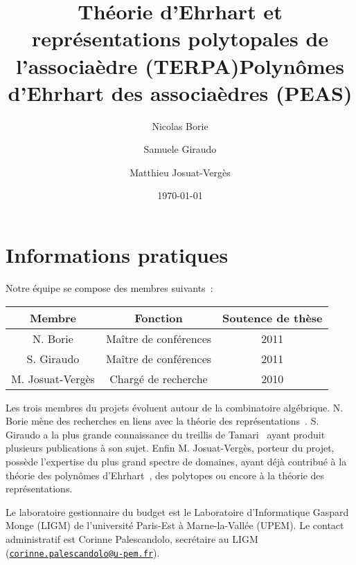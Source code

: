 \documentclass[a4paper, 10pt]{article}
\title{Théorie d'Ehrhart et représentations polytopales de
l'associaèdre (TERPA)} %
\title{{\bf P}olynômes d'{\bf E}hrhart des {\bf a}ssociaèdre{\bf s}
(PEAS)}
\date{\today}
\author{Nicolas Borie \and Samuele Giraudo \and Matthieu Josuat-Verg\`es}
\numberwithin{equation}{subsection}
\begin{document}
\maketitle
\vspace{-1.5cm}

\section*{\center Informations pratiques}
Notre équipe se compose des membres suivants~:
\begin{center} \small
\begin{tabular}{|c|c|c|} \hline
    {\bf Membre} & {\bf Fonction} & {\bf Soutence de thèse}
        \\ \hline \hline
    N. Borie & Maître de conférences & 2011 \\ \hline
    S. Giraudo & Maître de conférences & 2011 \\ \hline
    M. Josuat-Vergès & Chargé de recherche & 2010 \\ \hline
\end{tabular}
\end{center}
\smallbreak

Les trois membres du projets évoluent autour de la combinatoire
algébrique. N. Borie mène des recherches en liens avec la théorie des
représentations~\cite{Bor15}. S. Giraudo a la plus grande connaissance
du treillis de Tamari~\cite{Gir12} ayant produit plusieurs publications
à son sujet. Enfin M. Josuat-Vergès, porteur du projet, possède
l'expertise du plus grand spectre de domaines, ayant déjà contribué à la
théorie des polynômes d'Ehrhart~\cite{HJV16}, des polytopes ou encore à
la théorie des représentations.
\smallbreak

Le laboratoire gestionnaire du budget est le Laboratoire d'Informatique
Gaspard Monge (LIGM) de l'université Paris-Est à Marne-la-Vallée (UPEM).
Le contact administratif est Corinne Palescandolo, secrétaire au LIGM
(\href{mailto:corinne.palescandolo@u-pem.fr}
{\tt corinne.palescandolo@u-pem.fr}).
\smallbreak

\vspace{-1cm}

\end{document}
